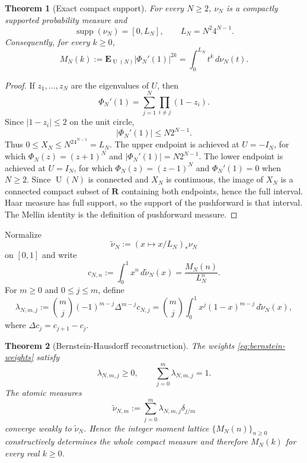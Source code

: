 \documentclass[11pt]{article}
\newcommand{\R}{\mathbf R}
\newcommand{\supp}{\operatorname{supp}}
\newcommand{\U}{\operatorname{U}}
\newcommand{\1}{\mathbf 1}
\newcommand{\wt}{\widetilde}
\newtheorem{theorem}{Theorem}[section]
\numberwithin{equation}{section}
\begin{document}
\begin{theorem}[Exact compact support]\label{thm:compact-support}
For every $N\ge2$, $\nu_N$ is a compactly supported probability measure and
\begin{equation}
  \supp(\nu_N)=[0,L_N],
  \qquad
  L_N=N^2 4^{N-1}.
\end{equation}
Consequently, for every $k\ge0$,
\begin{equation}
  M_N(k):=\mathbf E_{\U(N)}|\Phi_N'(1)|^{2k}
  =\int_0^{L_N}t^k\,d\nu_N(t).
\end{equation}
\end{theorem}

\begin{proof}
If $z_1,\dots,z_N$ are the eigenvalues of $U$, then
\begin{equation}
  \Phi_N'(1)=\sum_{j=1}^N\prod_{i\ne j}(1-z_i).
\end{equation}
Since $|1-z_i|\le2$ on the unit circle,
\begin{equation}
  |\Phi_N'(1)|\le N2^{N-1}.
\end{equation}
Thus $0\le X_N\le N^24^{N-1}=L_N$.  The upper endpoint is achieved at $U=-I_N$, for which $\Phi_N(z)=(z+1)^N$ and $|\Phi_N'(1)|=N2^{N-1}$.  The lower endpoint is achieved at $U=I_N$, for which $\Phi_N(z)=(z-1)^N$ and $\Phi_N'(1)=0$ when $N\ge2$.  Since $\U(N)$ is connected and $X_N$ is continuous, the image of $X_N$ is a connected compact subset of $\R$ containing both endpoints, hence the full interval.  Haar measure has full support, so the support of the pushforward is that interval.  The Mellin identity is the definition of pushforward measure.
\end{proof}

Normalize
\begin{equation}
  \wt\nu_N:=(x\mapsto x/L_N)_*\nu_N
\end{equation}
on $[0,1]$ and write
\begin{equation}
  c_{N,n}:=\int_0^1x^n\,d\wt\nu_N(x)=\frac{M_N(n)}{L_N^n}.
\end{equation}
For $m\ge0$ and $0\le j\le m$, define
\begin{equation}\label{eq:bernstein-weights}
  \lambda_{N,m,j}:=\binom mj(-1)^{m-j}\Delta^{m-j}c_{N,j}
  =\binom mj\int_0^1x^j(1-x)^{m-j}\,d\wt\nu_N(x),
\end{equation}
where $\Delta c_j=c_{j+1}-c_j$.

\begin{theorem}[Bernstein-Hausdorff reconstruction]\label{thm:bernstein}
The weights \eqref{eq:bernstein-weights} satisfy
\begin{equation}
  \lambda_{N,m,j}\ge0,
  \qquad
  \sum_{j=0}^m\lambda_{N,m,j}=1.
\end{equation}
The atomic measures
\begin{equation}
  \wt\nu_{N,m}:=\sum_{j=0}^m\lambda_{N,m,j}\delta_{j/m}
\end{equation}
converge weakly to $\wt\nu_N$.  Hence the integer moment lattice $\{M_N(n)\}_{n\ge0}$ constructively determines the whole compact measure and therefore $M_N(k)$ for every real $k\ge0$.
\end{theorem}
\end{document}
